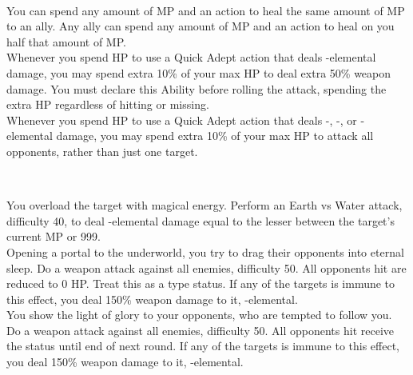 \begin{tabjob}
    \tabjobsep%

    \\
    \tabjobspec{}

         You can spend any amount of MP and an action to heal the same amount of MP to an ally. Any ally can spend any amount of MP and an action to heal on you half that amount of MP\@. \\

         Whenever you spend HP to use a Quick Adept action that deals -elemental damage, you may spend extra 10\% of your max HP to deal extra 50\% weapon damage. You must declare this Ability before rolling the attack, spending the extra HP regardless of hitting or missing. \\

         Whenever you spend HP to use a Quick Adept action that deals -, -, or -elemental damage, you may spend extra 10\% of your max HP to attack all opponents, rather than just one target. \\

    \tabjobsep%

     \\
    \tabjobspec{}

         You overload the target with magical energy. Perform an Earth vs Water attack, difficulty 40, to deal -elemental damage equal to the lesser between the target's current MP or 999. \\

         Opening a portal to the underworld, you try to drag their opponents into eternal sleep. Do a weapon attack against all enemies, difficulty 50. All opponents hit are reduced to 0 HP\@. Treat this as a  type status. If any of the targets is immune to this effect, you deal 150\% weapon damage to it, -elemental. \\
        
         You show the light of glory to your opponents, who are tempted to follow you. Do a weapon attack against all enemies, difficulty 50. All opponents hit receive the  status until end of next round. If any of the targets is immune to this effect, you deal 150\% weapon damage to it, -elemental. \\

\end{tabjob}
